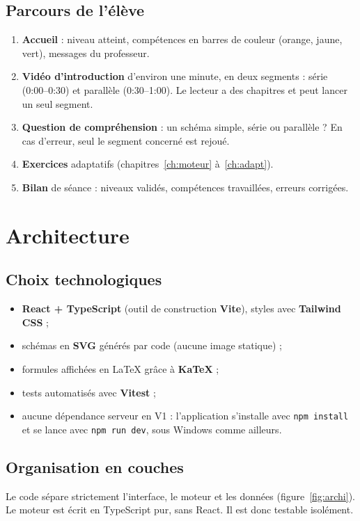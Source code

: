 \documentclass[11pt,a4paper]{report}
\newcommand{\code}[1]{\texttt{#1}}
\begin{document}
\section{Parcours de l'élève}
\begin{enumerate}
  \item \textbf{Accueil} : niveau atteint, compétences en barres de couleur (orange, jaune, vert), messages du professeur.
  \item \textbf{Vidéo d'introduction} d'environ une minute, en deux segments : série (0:00--0:30) et parallèle (0:30--1:00). Le lecteur a des chapitres et peut lancer un seul segment.
  \item \textbf{Question de compréhension} : un schéma simple, série ou parallèle ? En cas d'erreur, seul le segment concerné est rejoué.
  \item \textbf{Exercices} adaptatifs (chapitres~\ref{ch:moteur} à~\ref{ch:adapt}).
  \item \textbf{Bilan} de séance : niveaux validés, compétences travaillées, erreurs corrigées.
\end{enumerate}

\chapter{Architecture}\label{ch:archi}

\section{Choix technologiques}
\begin{itemize}
  \item \textbf{React + TypeScript} (outil de construction \textbf{Vite}), styles avec \textbf{Tailwind CSS} ;
  \item schémas en \textbf{SVG} générés par code (aucune image statique) ;
  \item formules affichées en \LaTeX{} grâce à \textbf{KaTeX} ;
  \item tests automatisés avec \textbf{Vitest} ;
  \item aucune dépendance serveur en V1 : l'application s'installe avec \code{npm install} et se lance avec \code{npm run dev}, sous Windows comme ailleurs.
\end{itemize}

\section{Organisation en couches}
Le code sépare strictement l'interface, le moteur et les données (figure~\ref{fig:archi}). Le moteur est écrit en TypeScript pur, sans React. Il est donc testable isolément.
\end{document}
